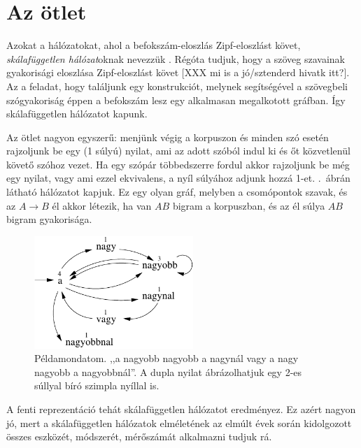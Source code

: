 \documentclass{llncs}
\newcommand{\matnyil}{\ensuremath{\rightarrow}}
\newcommand{\XXX}[1]{{\small \color{megjcolor} [XXX #1]}}
\begin{document}
\section{Az ötlet}

Azokat a hálózatokat, ahol a befokszám-eloszlás
Zipf-eloszlást követ, \emph{skálafüggetlen hálózat}oknak nevezzük
\cite[703.\ oldal]{kovacs2012magyar}.
%
Régóta tudjuk, hogy a szöveg szavainak gyakorisági eloszlása
Zipf-eloszlást követ \XXX{mi is a jó/sztenderd hivatk itt?}.
%
Az a feladat, hogy találjunk egy konstrukciót,
melynek segítségével a szövegbeli szógyakoriság
éppen a befokszám lesz egy alkalmasan megalkotott gráfban.
%
Így skálafüggetlen hálózatot kapunk.

Az ötlet nagyon egyszerű:
menjünk végig a korpuszon és
minden szó esetén rajzoljunk be egy (1 súlyú) nyilat,
ami az adott szóból indul ki és őt közvetlenül követő szóhoz vezet.
%
Ha egy szópár többedszerre fordul akkor rajzoljunk be még egy nyilat,
vagy ami ezzel ekvivalens, a nyíl súlyához adjunk hozzá 1-et.
%
.\ ábrán látható hálózatot kapjuk.
%
Ez egy olyan gráf, melyben a csomópontok szavak,
és az $A\matnyil B$ él akkor létezik, ha van $AB$ bigram a korpuszban,
és az él súlya $AB$ bigram gyakorisága.

\begin{figure}[h]
\begin{center}
\includegraphics[width=6cm]{scfr_pelda.pdf}
\end{center}
\caption{Példamondatom.
,,a nagyobb nagyobb a nagynál vagy a nagy nagyobb a nagyobbnál''.
A dupla nyilat ábrázolhatjuk egy 2-es súllyal bíró szimpla nyíllal is.
\label{fig:scfr_pelda}}
\end{figure}

A fenti reprezentáció tehát skálafüggetlen hálózatot eredményez.
%
Ez azért nagyon jó, mert a skálafüggetlen hálózatok elméletének
\cite{barabasi2009scalefree}
az elmúlt évek során kidolgozott összes 
eszközét, módszerét, mérőszámát alkalmazni tudjuk rá.
\end{document}
